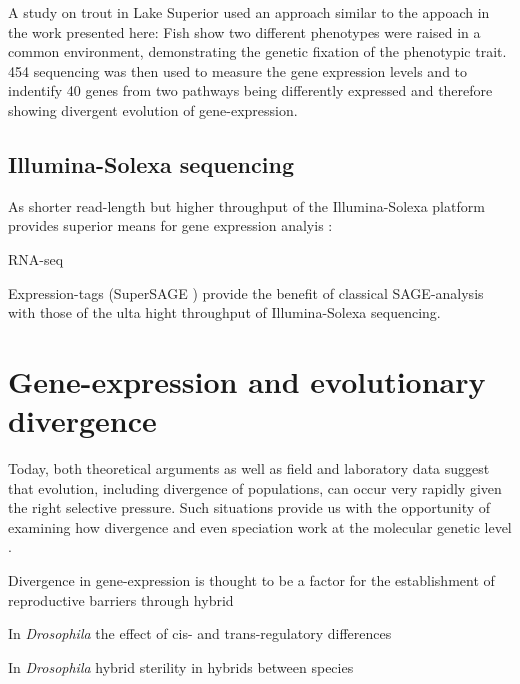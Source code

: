 A study on trout in Lake Superior \cite{pmid20331779} used an approach
similar to the appoach in the work presented here: Fish show two
different phenotypes were raised in a common environment,
demonstrating the genetic fixation of the phenotypic trait. 454
sequencing was then used to measure the gene expression levels and to
indentify 40 genes from two pathways being differently expressed and
therefore showing divergent evolution of gene-expression.


\subsection{Illumina-Solexa sequencing}
\label{ill-seq}




As shorter read-length but higher throughput of the Illumina-Solexa
platform provides superior means for gene expression analyis
\cite{pmid21627854}:

RNA-seq \cite{pmid19015660}

Expression-tags (SuperSAGE \cite{pmid20967605}) provide the benefit of
classical SAGE-analysis \cite{pmid7570003} with those of the ulta
hight throughput of Illumina-Solexa sequencing.


\section{Gene-expression and evolutionary divergence}

Today, both theoretical arguments as well as field and laboratory data
suggest that evolution, including divergence of populations, can occur
very rapidly given the right selective pressure. Such situations
provide us with the opportunity of examining how divergence and even
speciation work at the molecular genetic level
\cite{via_ecological_2002} .

Divergence in gene-expression is thought to be a factor for the
establishment of reproductive barriers through hybrid

In \textit{Drosophila} the effect of cis- and trans-regulatory
differences \cite{pmid20354124}

In \textit{Drosophila} hybrid sterility in hybrids between species
\cite{pmid16757655}




     